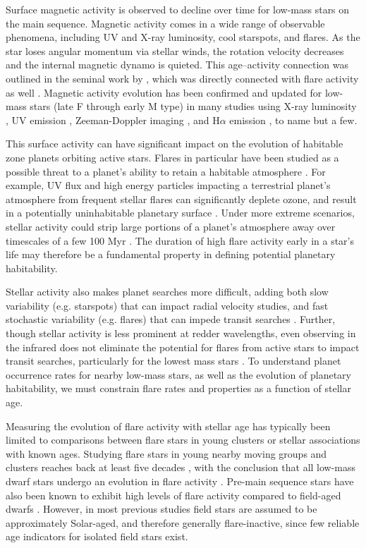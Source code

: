 \documentclass[preprint2]{aastex62}
\begin{document}
Surface magnetic activity is observed to decline over time for low-mass stars on the main sequence. Magnetic activity comes in a wide range of observable phenomena, including UV and X-ray luminosity, cool starspots, and flares. 
As the star loses angular momentum via stellar winds, the rotation velocity decreases and the internal magnetic dynamo is quieted. This age--activity connection was outlined in the seminal work by \citet{skumanich1972}, which was directly connected with flare activity as well \citep{skumanich1986}. Magnetic activity evolution has been confirmed and updated for low-mass stars (late F through early M type) in many studies using X-ray luminosity \citep{wright2011}, UV emission \citep{shkolnik2014}, Zeeman-Doppler imaging \citep{vidotto2014}, and H$\alpha$ emission \cite{west2015}, to name but a few. 


This surface activity can have significant impact on the evolution of habitable zone planets orbiting active stars. Flares in particular have been studied as a possible threat to a planet's ability to retain a habitable atmosphere \citep[e.g.][]{segura2010,luger2015,tilley2017}. For example, UV flux and high energy particles impacting a terrestrial planet's atmosphere from frequent stellar flares can significantly deplete ozone, and result in a potentially uninhabitable planetary surface \citep{tilley2017}. Under more extreme scenarios, stellar activity could strip large portions of a planet's atmosphere away over timescales of a few 100 Myr \citep{luger2015}. The duration of high flare activity early in a star's life may therefore be a fundamental property in defining potential planetary habitability. 


Stellar activity also makes planet searches more difficult, adding both slow variability (e.g. starspots) that can impact radial velocity studies, and fast stochastic variability (e.g. flares) that can impede transit searches \citep[e.g.][]{kipping2017}. Further, though stellar activity is less prominent at redder wavelengths, even observing in the infrared does not eliminate the potential for flares from active stars to impact transit searches, particularly for the lowest mass stars \citep{davenport2017a}. To understand planet occurrence rates for nearby low-mass stars, as well as the evolution of planetary habitability, we must constrain flare rates and properties as a function of stellar age.


Measuring the evolution of flare activity with stellar age has typically been limited to comparisons between flare stars in young clusters or stellar associations with known ages. Studying flare stars in young nearby moving groups and clusters reaches back at least five decades \citep{haro1966}, with the conclusion that all low-mass dwarf stars undergo an evolution in flare activity \citep{ambartsumian1975}. Pre-main sequence stars have also been known to exhibit high levels of flare activity compared to field-aged dwarfs \citep[e.g.][]{feigelson2001}. However, in most previous studies field stars are assumed to be approximately Solar-aged, and therefore generally flare-inactive, since few reliable age indicators for isolated field stars exist.
\end{document}
